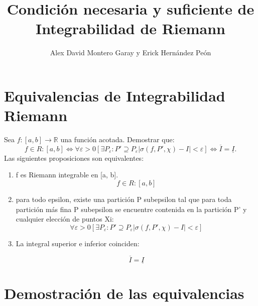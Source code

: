 \documentclass{article}
\title{Condición necesaria y suficiente de Integrabilidad de Riemann}
\author{Alex David Montero Garay y Erick Hernández Peón }
\date{}
\begin{document}
	\maketitle
	
	\section*{Equivalencias de Integrabilidad Riemann}
	Sea \( f: [a, b] \to \mathbb{R} \) una función acotada. 
	Demostrar que:
	\[
	   f \in R:[a,b] \iff \forall \varepsilon >0   [\exists P_\varepsilon :  P' \supseteq P_\varepsilon 	|\sigma(f, P', \chi) - I| < \varepsilon] \iff 	\overline{ I } = \underline{I}.
	\]
 Las siguientes proposiciones son equivalentes:
	\begin{enumerate}
		\item f es Riemann integrable en [a, b]. \[  f \in R:[a,b] \]
		\item  para todo epsilon, existe una partición P subepsilon tal que para toda partición más fina P subepsilon se encuentre contenida en la partición P' y cualquier elección de puntos Xi: 
		\[ \forall \varepsilon>0   [\exists P_\varepsilon :  P' \supseteq P_\varepsilon 	|\sigma(f, P', \chi) - I| < \varepsilon]
		\]
		
	
		\item La integral superior e inferior coinciden:
		
		
		\[
		\overline{I} = \underline{I} 
		\]
		
		
	\end{enumerate}
	
	\section*{Demostración de las equivalencias}
	
\end{document}
